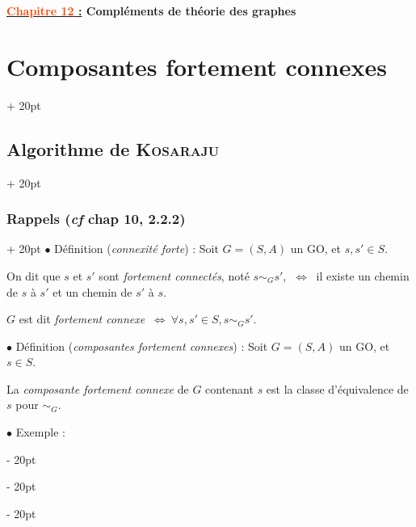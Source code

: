 \documentclass[a4paper, 12pt, twoside]{article}
\renewcommand{\emph}{\textcolor{ff4500}}
\newcommand{\ssi}{\ \Leftrightarrow \ }
\newcommand{\ind}[1][20pt]{\advance\leftskip + #1}
\newcommand{\deind}[1][20pt]{\advance\leftskip - #1}
\newenvironment{indt}[2][20pt]{#2 \par \ind[#1]}{\par \deind} %
\newcommand{\thetitle}[2]{\begin{center}\textbf{{\LARGE \underline{\emph{#1} :}} {\Large #2}}\end{center}}
\begin{document}
    
    
    \thetitle{Chapitre 12}{Compléments de théorie des graphes}
    
    \tableofcontents
    \newpage
    
    
    \begin{indt}{\section{Composantes fortement connexes}}
        
        \begin{indt}{\subsection{Algorithme de \textsc{Kosaraju}}}
            \begin{indt}{\subsubsection{Rappels (\textit{cf} chap 10, 2.2.2)}}
                $\bullet$ Définition (\textit{connexité forte}) :
                Soit $G = (S, A)$ un GO, et $s, s' \in S$.

                On dit que $s$ et $s'$ sont \textit{fortement connectés}, noté $s \sim_G s'$, $\ssi$ il existe un chemin de $s$ à $s'$ et un chemin de $s'$ à $s$.

                $G$ est dit \textit{fortement connexe} $\ssi \forall s, s' \in S, s \sim_G s'$.

                \vspace{12pt}
                
                $\bullet$ Définition (\textit{composantes fortement connexes}) :
                Soit $G = (S, A)$ un GO, et $s \in S$.

                La \textit{composante fortement connexe} de $G$ contenant $s$ est la classe d'équivalence de $s$ pour $\sim_G$.

                \vspace{12pt}
                
                $\bullet$ Exemple :
                
                \begin{center}
\end{center}
\end{indt}
\end{indt}
\end{indt}
\end{document}
